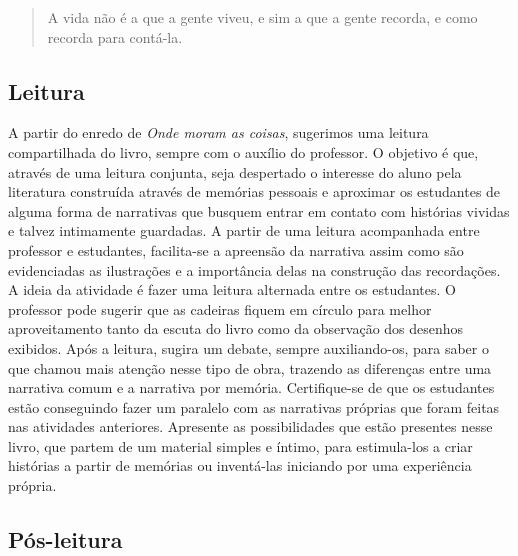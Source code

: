 \documentclass[11pt]{extarticle}
\begin{document}
\begin{quote}

A vida não é a que a gente viveu, e sim a que a gente recorda, e como recorda para contá-la. 

\end{quote}

\subsection{Leitura}




A partir do enredo de \textit{Onde moram as coisas}, sugerimos uma leitura compartilhada do livro, sempre com o auxílio do professor. O objetivo é que, através de uma leitura conjunta, seja despertado o interesse do aluno pela literatura construída através de memórias pessoais e aproximar os estudantes de alguma forma de narrativas que busquem entrar em contato com histórias vividas e talvez intimamente guardadas. A partir de uma leitura acompanhada entre professor e estudantes, facilita-se a apreensão da narrativa assim como são evidenciadas as ilustrações e a importância delas na construção das recordações. A ideia da atividade é fazer uma leitura alternada entre os estudantes. O professor pode sugerir que as cadeiras fiquem em círculo para melhor aproveitamento tanto da escuta do livro como da observação dos desenhos exibidos. Após a leitura, sugira um debate, sempre auxiliando-os, para saber o que chamou mais atenção nesse tipo de obra, trazendo as diferenças entre uma narrativa comum e a narrativa por memória. Certifique-se de que os estudantes estão conseguindo fazer um paralelo com as narrativas próprias que foram feitas nas atividades anteriores. Apresente as possibilidades que estão presentes nesse livro, que partem de um material simples e íntimo, para estimula-los a criar histórias a partir de memórias ou inventá-las iniciando por uma experiência própria.


\subsection{Pós-leitura} 
\end{document}
